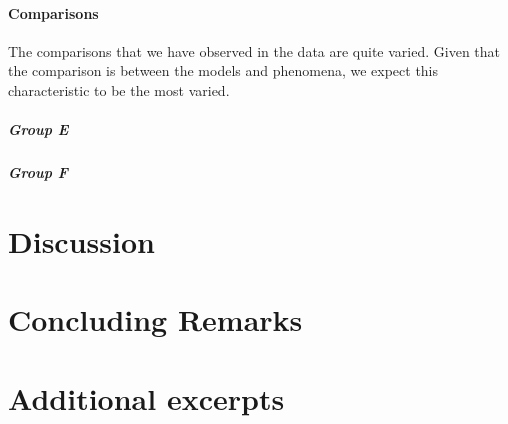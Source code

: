 \documentclass{msuphddissertation}
\begin{document}
\begin{doublespace}
\subsubsection{Comparisons}

The comparisons that we have observed in the data are quite varied.  Given that the comparison is between the models and phenomena, we expect this characteristic to be the most varied.

\paragraph{Group E}

\paragraph{Group F}

%
%

\chapter{Discussion}

%
%

\chapter{Concluding Remarks}

%
%

\appendices

\chapter{Additional excerpts}

%
%

\end{doublespace}



\end{document}
